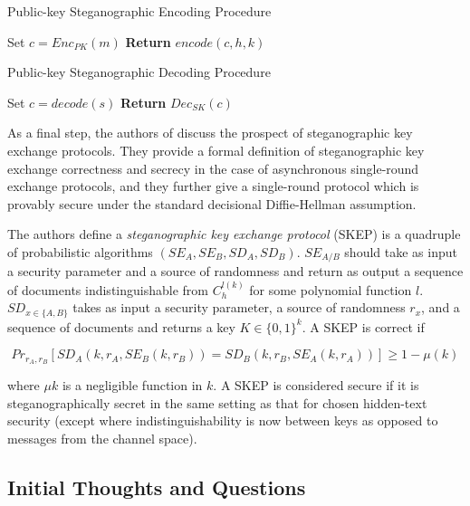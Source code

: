 \documentclass{article}
\begin{document}
\begin{algorithm}[H]
\caption{Public-key Steganographic Encoding Procedure}\label{1a}
\begin{algorithmic}[1]
\State Set $c = Enc_{PK}(m)$
\State \textbf{Return} $encode(c,h,k)$
\EndProcedure
\end{algorithmic}
\end{algorithm}

\begin{algorithm}[H]
\caption{Public-key Steganographic Decoding Procedure}\label{1a}
\begin{algorithmic}[1]
\State Set $c = decode(s)$
\State \textbf{Return} $Dec_{SK}(c)$
\EndProcedure
\end{algorithmic}
\end{algorithm}

As a final step, the authors of \cite{BiglouPubKey} discuss the prospect of steganographic key exchange protocols.
They provide a formal definition of steganographic key exchange correctness and secrecy in the case of asynchronous single-round 
exchange protocols, and they further give a single-round protocol which is provably secure under the standard decisional 
Diffie-Hellman assumption.

The authors define a \textit{steganographic key exchange protocol} (SKEP) is a quadruple of probabilistic algorithms
$(SE_A, SE_B, SD_A, SD_B)$.  $SE_{A/B}$ should take as input a security parameter and a source of randomness and return 
as output a sequence of documents indistinguishable from $C_h^{l(k)}$ for some polynomial function $l$.  $SD_{x \in \{A,B\}}$ takes
as input a security parameter, a source of randomness $r_x$, and a sequence of documents and returns a key $K \in \{0,1\}^k$.  A SKEP
is correct if 

\[ Pr_{r_A,r_B}[ SD_A(k,r_A,SE_B(k, r_B)) = SD_B(k,r_B,SE_A(k, r_A)) ] \geq 1 - \mu(k) \]

\noindent where $\mu{k}$ is a negligible function in $k$.  A SKEP is considered secure if it is steganographically secret 
in the same setting as that for chosen hidden-text security (except where indistinguishability is now between keys as opposed to 
messages from the channel space).

\subsection{Initial Thoughts and Questions}
\end{document}
